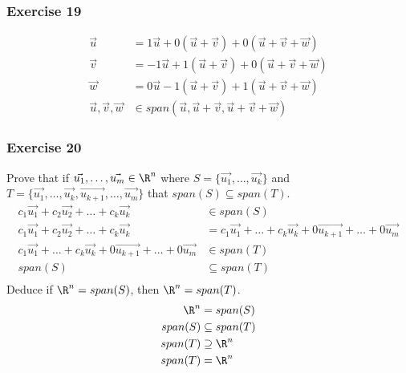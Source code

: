 \documentclass{math}
\begin{document}
\subsubsection*{Exercise 19}
\begin{align*}
  \vec{u} &= 1\vec{u}+0(\vec{u}+\vec{v})+0(\vec{u}+\vec{v}+\vec{w}) \\
  \vec{v} &= -1\vec{u}+1(\vec{u}+\vec{v})+0(\vec{u}+\vec{v}+\vec{w}) \\
  \vec{w} &= 0\vec{u}-1(\vec{u}+\vec{v})+1(\vec{u}+\vec{v}+\vec{w}) \\
  \vec{u},\vec{v},\vec{w} &\in
    span(\vec{u},\vec{u}+\vec{v},\vec{u}+\vec{v}+\vec{w})
\end{align*}

\subsubsection*{Exercise 20}
Prove that if \( \vec{u_1},\dots,\vec{u_m}\in\R^n \) where \( S = \{\vec{u_1},
\dots,\vec{u_k}\} \) and \( T = \{\vec{u_1},\dots,\vec{u_k},\vec{u_{k+1}},\dots,
\vec{u_m}\} \) that \( span(S)\subseteq span(T) \).
\begin{align*}
  c_1\vec{u_1}+c_2\vec{u_2}+\dots+c_k\vec{u_k} &\in span(S) \\
  c_1\vec{u_1}+c_2\vec{u_2}+\dots+c_k\vec{u_k} &=
    c_1\vec{u_1}+\dots+c_k\vec{u_k}+0\vec{u_{k+1}}+\dots+0\vec{u_m} \\
  c_1\vec{u_1}+\dots+c_k\vec{u_k}+0\vec{u_{k+1}}+\dots+0\vec{u_m} &\in
    span(T) \\
  span(S) &\subseteq span(T) \\
\end{align*}
Deduce if \( \R^n = span(S) \), then \( \R^n = span(T) \).
\begin{align*}
  \R^n &= span(S) \\
  span(S) &\subseteq span(T) \\
  span(T) &\supseteq \R^n \\
  span(T) &= \R^n \\
\end{align*}
\end{document}
